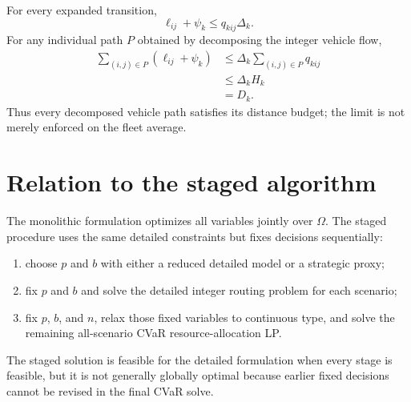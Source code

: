 \documentclass[11pt]{article}
\begin{document}
For every expanded transition,
\begin{equation}
\ell_{ij}+\psi_k
\leq q_{kij}\Delta_k.
\end{equation}
For any individual path $P$ obtained by decomposing the integer vehicle flow,
\begin{align}
\sum_{(i,j)\in P}(\ell_{ij}+\psi_k)
&\leq
\Delta_k\sum_{(i,j)\in P}q_{kij}\\
&\leq
\Delta_k H_k\\
&=D_k.
\end{align}
Thus every decomposed vehicle path satisfies its distance budget; the limit is
not merely enforced on the fleet average.

\section{Relation to the staged algorithm}

The monolithic formulation optimizes all variables jointly over
$\Omega$.  The staged procedure uses the same detailed constraints but fixes
decisions sequentially:
\begin{enumerate}[label=\arabic*.]
\item choose $p$ and $b$ with either a reduced detailed model or a strategic
      proxy;
\item fix $p$ and $b$ and solve the detailed integer routing problem for each
      scenario;
\item fix $p$, $b$, and $n$, relax those fixed variables to continuous type,
      and solve the remaining all-scenario CVaR resource-allocation LP.
\end{enumerate}
The staged solution is feasible for the detailed formulation when every stage
is feasible, but it is not generally globally optimal because earlier fixed
decisions cannot be revised in the final CVaR solve.
\end{document}
